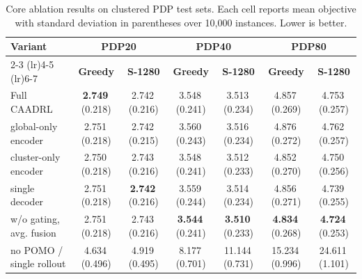 \documentclass[pdflatex,sn-basic,Numbered]{sn-jnl}
\begin{document}
\begin{table}[t]
\centering
\caption{Heter runtime and memory profiling under synchronized GPU timing.}
\label{tab:heter_runtime_memory}
\resizebox{\textwidth}{!}{}
\end{table}

\begin{table}[t]
\centering
\caption{Core ablation results on clustered PDP test sets. Each cell reports mean objective with standard deviation in parentheses over 10,000 instances. Lower is better.}
\label{tab:ablation}
\small
\setlength{\tabcolsep}{3pt}
\renewcommand{\arraystretch}{1.12}
\begin{tabular}{lcccccc}
\toprule
\multirow{2}{*}{\textbf{Variant}} & \multicolumn{2}{c}{\textbf{PDP20}} & \multicolumn{2}{c}{\textbf{PDP40}} & \multicolumn{2}{c}{\textbf{PDP80}} \\
\cmidrule(lr){2-3} \cmidrule(lr){4-5} \cmidrule(lr){6-7}
 & \textbf{Greedy} & \textbf{S-1280} & \textbf{Greedy} & \textbf{S-1280} & \textbf{Greedy} & \textbf{S-1280} \\
\midrule
Full CAADRL & \textbf{2.749}{\scriptsize\,(}0.218{\scriptsize)} & 2.742{\scriptsize\,(}0.216{\scriptsize)} & 3.548{\scriptsize\,(}0.241{\scriptsize)} & 3.513{\scriptsize\,(}0.234{\scriptsize)} & 4.857{\scriptsize\,(}0.269{\scriptsize)} & 4.753{\scriptsize\,(}0.257{\scriptsize)} \\
global-only encoder & 2.751{\scriptsize\,(}0.218{\scriptsize)} & 2.742{\scriptsize\,(}0.215{\scriptsize)} & 3.560{\scriptsize\,(}0.243{\scriptsize)} & 3.516{\scriptsize\,(}0.234{\scriptsize)} & 4.876{\scriptsize\,(}0.272{\scriptsize)} & 4.762{\scriptsize\,(}0.257{\scriptsize)} \\
cluster-only encoder & 2.750{\scriptsize\,(}0.218{\scriptsize)} & 2.743{\scriptsize\,(}0.216{\scriptsize)} & 3.548{\scriptsize\,(}0.241{\scriptsize)} & 3.512{\scriptsize\,(}0.233{\scriptsize)} & 4.852{\scriptsize\,(}0.270{\scriptsize)} & 4.750{\scriptsize\,(}0.256{\scriptsize)} \\
single decoder & 2.751{\scriptsize\,(}0.218{\scriptsize)} & \textbf{2.742}{\scriptsize\,(}0.216{\scriptsize)} & 3.559{\scriptsize\,(}0.244{\scriptsize)} & 3.514{\scriptsize\,(}0.234{\scriptsize)} & 4.856{\scriptsize\,(}0.271{\scriptsize)} & 4.739{\scriptsize\,(}0.255{\scriptsize)} \\
w/o gating, avg. fusion & 2.751{\scriptsize\,(}0.218{\scriptsize)} & 2.743{\scriptsize\,(}0.216{\scriptsize)} & \textbf{3.544}{\scriptsize\,(}0.241{\scriptsize)} & \textbf{3.510}{\scriptsize\,(}0.233{\scriptsize)} & \textbf{4.834}{\scriptsize\,(}0.268{\scriptsize)} & \textbf{4.724}{\scriptsize\,(}0.253{\scriptsize)} \\
no POMO / single rollout & 4.634{\scriptsize\,(}0.496{\scriptsize)} & 4.919{\scriptsize\,(}0.495{\scriptsize)} & 8.177{\scriptsize\,(}0.701{\scriptsize)} & 11.144{\scriptsize\,(}0.731{\scriptsize)} & 15.234{\scriptsize\,(}0.996{\scriptsize)} & 24.611{\scriptsize\,(}1.101{\scriptsize)} \\
\bottomrule
\end{tabular}
\end{table}
\end{document}
